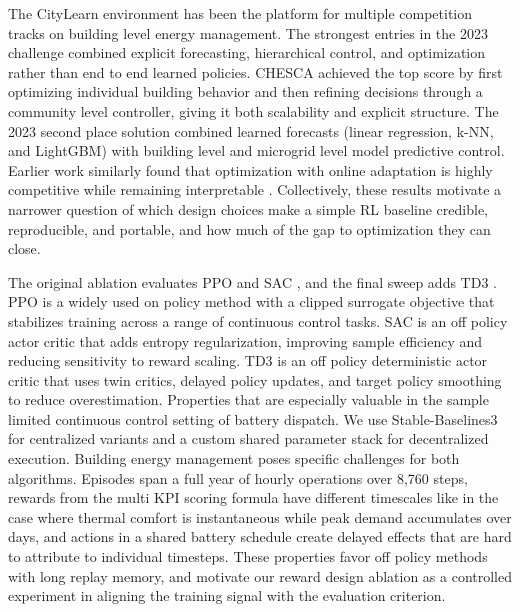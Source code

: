\documentclass{article}
\begin{document}
The CityLearn environment \citep{vazquez2020citylearn, citylearnrepo} has been the platform for multiple competition tracks on building level energy management. The strongest entries in the 2023 challenge combined explicit forecasting, hierarchical control, and optimization rather than end to end learned policies. CHESCA \citep{pinto2024citylearn} achieved the top score by first optimizing individual building behavior and then refining decisions through a community level controller, giving it both scalability and explicit structure. The 2023 second place solution \citep{zheng2025optimizing} combined learned forecasts (linear regression, k-NN, and LightGBM) with building level and microgrid level model predictive control. Earlier work similarly found that optimization with online adaptation is highly competitive while remaining interpretable \citep{khattar2023winning}. Collectively, these results motivate a narrower question of which design choices make a simple RL baseline credible, reproducible, and portable, and how much of the gap to optimization they can close.

The original ablation evaluates PPO \citep{schulman2017proximal} and SAC \citep{haarnoja2018soft}, and the final sweep adds TD3 \citep{fujimoto2018addressing}. PPO is a widely used on policy method with a clipped surrogate objective that stabilizes training across a range of continuous control tasks. SAC is an off policy actor critic that adds entropy regularization, improving sample efficiency and reducing sensitivity to reward scaling. TD3 is an off policy deterministic actor critic that uses twin critics, delayed policy updates, and target policy smoothing to reduce overestimation. Properties that are especially valuable in the sample limited continuous control setting of battery dispatch. We use Stable-Baselines3 \citep{raffin2021stable} for centralized variants and a custom shared parameter stack for decentralized execution. Building energy management poses specific challenges for both algorithms. Episodes span a full year of hourly operations over 8,760 steps, rewards from the multi KPI scoring formula have different timescales like in the case where thermal comfort is instantaneous while peak demand accumulates over days, and actions in a shared battery schedule create delayed effects that are hard to attribute to individual timesteps. These properties favor off policy methods with long replay memory, and motivate our reward design ablation as a controlled experiment in aligning the training signal with the evaluation criterion.
\end{document}
